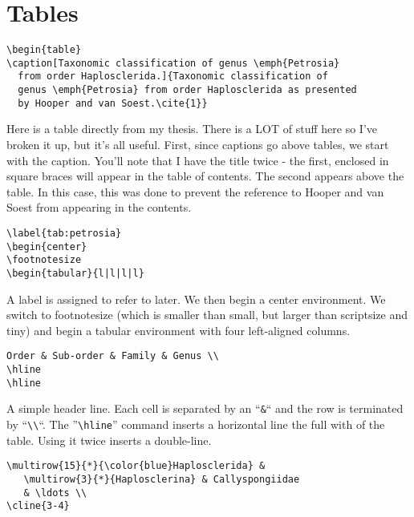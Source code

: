 \section{Tables}

\small\singlespacing
\begin{verbatim}
\begin{table}
\caption[Taxonomic classification of genus \emph{Petrosia}
  from order Haplosclerida.]{Taxonomic classification of
  genus \emph{Petrosia} from order Haplosclerida as presented
  by Hooper and van Soest.\cite{1}}
\end{verbatim}

\normalsize\doublespacing
Here is a table directly from my thesis.  There is a LOT of stuff here so I've broken it up, but it's all useful.  First, since captions go above tables, we start with the caption.  You'll note that I have the title twice - the first, enclosed in square braces will appear in the table of contents.  The second appears above the table.  In this case, this was done to prevent the reference to Hooper and van Soest from appearing in the contents.

\small\singlespacing
\begin{verbatim}
\label{tab:petrosia}
\begin{center}
\footnotesize
\begin{tabular}{l|l|l|l}
\end{verbatim}

\normalsize\doublespacing
A label is assigned to refer to later.  We then begin a center environment.  We switch to footnotesize (which is smaller than small, but larger than scriptsize and tiny) and begin a tabular environment with four left-aligned columns.

\small\singlespacing
\begin{verbatim}
Order & Sub-order & Family & Genus \\
\hline
\hline
\end{verbatim}

\normalsize\doublespacing
A simple header line.  Each cell is separated by an ``\small\verb$&$\normalsize`` and the row is terminated by ``\small\verb$\\$\normalsize``.  The ''\small\verb$\hline$\normalsize'' command inserts a horizontal line the full with of the table.  Using it twice inserts a double-line.

\small\singlespacing
\begin{verbatim}
\multirow{15}{*}{\color{blue}Haplosclerida} &
   \multirow{3}{*}{Haplosclerina} & Callyspongiidae
   & \ldots \\
\cline{3-4}
\end{verbatim}

